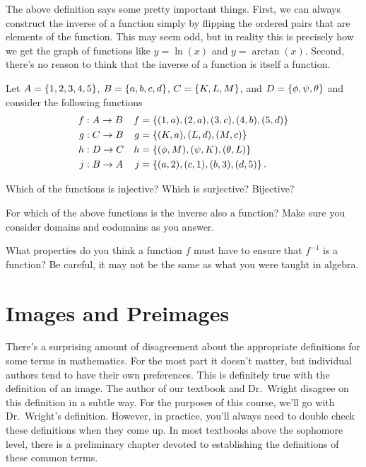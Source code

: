 The above definition says some pretty important things.  First, we can always construct the inverse of a function simply by flipping the ordered pairs that are elements of the function.  This may seem odd, but in reality this is precisely how we get the graph of functions like $y = \ln(x)$ and $y=\arctan(x)$.  Second, there's no reason to think that the inverse of a function is itself a function.  

\begin{question}[resume]
\item Let $A=\left\{1,2,3,4,5\right\}$, $B=\left\{a,b,c,d\right\}$, $C=\left\{K,L,M\right\}$, and $D = \left\{\phi,\psi,\theta\right\}$ and consider the following functions
	\begin{align*}
	f &: A \to B & f&= \left\{(1,a),(2,a),(3,c),(4,b),(5,d)\right\}\\
	g &: C \to B & g&= \left\{(K,a),(L,d),(M,c)\right\}\\
	h &: D \to C & h&= \left\{(\phi,M),(\psi,K),(\theta,L)\right\}\\
	j &: B \to A & j&= \left\{(a,2),(c,1),(b,3),(d,5)\right\}.
	\end{align*}
	\begin{qpart}
	\item Which of the functions is injective?  Which is surjective?  Bijective?
	
	\vspace{3in}
	
	\item For which of the above functions is the inverse also a function?  Make sure you consider domains and codomains as you answer.
	
	\vspace{1in}
	
	\item What properties do you think a function $f$ must have to ensure that $f^{-1}$ is a function?  Be careful, it may not be the same as what you were taught in algebra.
	
	\vspace{1.5in}
	\end{qpart}
\end{question}

\section{Images and Preimages}

There's a surprising amount of disagreement about the appropriate definitions for some terms in mathematics.  For the most part it doesn't matter, but individual authors tend to have their own preferences.  This is definitely true with the definition of an image.  The author of our textbook and Dr.~Wright disagree on this definition in a subtle way.  For the purposes of this course, we'll go with Dr.~Wright's definition.  However, in practice, you'll always need to double check these definitions when they come up.  In most textbooks above the sophomore level, there is a preliminary chapter devoted to establishing the definitions of these common terms. 

